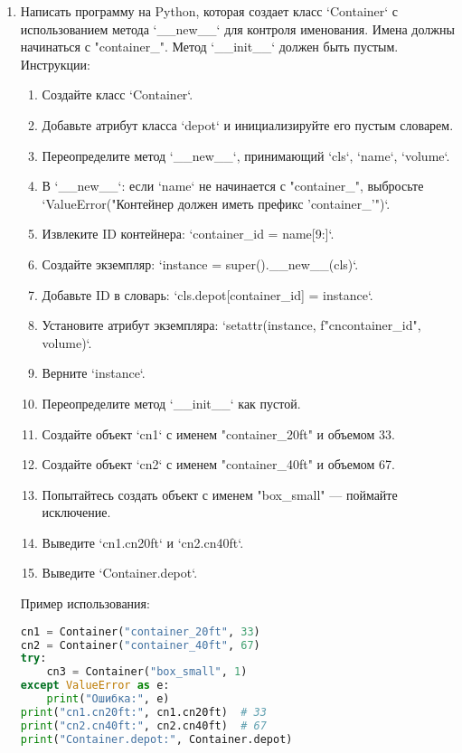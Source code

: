 \begin{enumerate}
\item Написать программу на Python, которая создает класс `Container` с использованием метода `\_\_new\_\_` для контроля именования. Имена должны начинаться с "container\_". Метод `\_\_init\_\_` должен быть пустым.
Инструкции:
\begin{enumerate}
    \item Создайте класс `Container`.
    \item Добавьте атрибут класса `depot` и инициализируйте его пустым словарем.
    \item Переопределите метод `\_\_new\_\_`, принимающий `cls`, `name`, `volume`.
    \item В `\_\_new\_\_`: если `name` не начинается с "container\_", выбросьте `ValueError("Контейнер должен иметь префикс 'container\_'")`.
    \item Извлеките ID контейнера: `container\_id = name[9:]`.
    \item Создайте экземпляр: `instance = super().\_\_new\_\_(cls)`.
    \item Добавьте ID в словарь: `cls.depot[container\_id] = instance`.
    \item Установите атрибут экземпляра: `setattr(instance, f"cn{container\_id}", volume)`.
    \item Верните `instance`.
    \item Переопределите метод `\_\_init\_\_` как пустой.
    \item Создайте объект `cn1` с именем "container\_20ft" и объемом 33.
    \item Создайте объект `cn2` с именем "container\_40ft" и объемом 67.
    \item Попытайтесь создать объект с именем "box\_small" — поймайте исключение.
    \item Выведите `cn1.cn20ft` и `cn2.cn40ft`.
    \item Выведите `Container.depot`.
\end{enumerate}
Пример использования:
\begin{lstlisting}[language=Python]
cn1 = Container("container_20ft", 33)
cn2 = Container("container_40ft", 67)
try:
    cn3 = Container("box_small", 1)
except ValueError as e:
    print("Ошибка:", e)
print("cn1.cn20ft:", cn1.cn20ft)  # 33
print("cn2.cn40ft:", cn2.cn40ft)  # 67
print("Container.depot:", Container.depot)
\end{lstlisting}



\end{enumerate}
